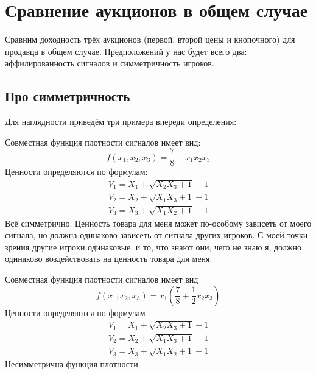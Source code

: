 \chapter{Сравнение аукционов в общем случае}



Сравним доходность трёх аукционов (первой, второй цены и кнопочного) для продавца в общем случае. Предположений у нас будет всего два: аффилированность сигналов и симметричность игроков.

\section{Про симметричность}
Для наглядности приведём три примера впереди определения:

\begin{myex} Совместная функция плотности сигналов имеет вид:
\begin{equation}
f(x_{1},x_{2},x_{3})=\frac{7}{8}+x_{1}x_{2}x_{3}
\end{equation}
Ценности определяются по формулам:
\begin{equation}
\begin{array}{c}
V_{1}=X_{1}+\sqrt{X_{2}X_{3}+1}-1 \\
V_{2}=X_{2}+\sqrt{X_{1}X_{3}+1}-1 \\
V_{3}=X_{3}+\sqrt{X_{1}X_{2}+1}-1
\end{array}
\end{equation}
Всё симметрично. Ценность товара для меня может по-особому зависеть от моего сигнала, но должна одинаково зависеть от сигнала других игроков. С моей точки зрения другие игроки одинаковые, и то, что знают они, чего не знаю я, должно одинаково воздействовать на ценность товара для меня.
\end{myex}


\begin{myex} Совместная функция плотности сигналов имеет вид
\begin{equation}
f(x_{1},x_{2},x_{3})=x_{1}\left(\frac{7}{8}+\frac{1}{2}x_{2}x_{3}\right)
\end{equation}
Ценности определяются по формулам
\begin{equation}
\begin{array}{c}
V_{1}=X_{1}+\sqrt{X_{2}X_{3}+1}-1 \\
V_{2}=X_{2}+\sqrt{X_{1}X_{3}+1}-1 \\
V_{3}=X_{3}+\sqrt{X_{1}X_{2}+1}-1
\end{array}
\end{equation}
Несимметрична функция плотности.
\end{myex}


